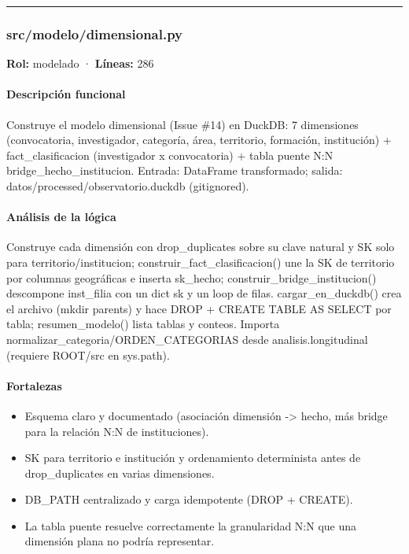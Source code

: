 \medskip
\hrule

\subsubsection{src/modelo/dimensional.py}
\textbf{Rol:} modelado · \textbf{Líneas:} 286

\paragraph{Descripción funcional}
Construye el modelo dimensional (Issue \#14) en DuckDB: 7 dimensiones (convocatoria, investigador, categoría, área, territorio, formación, institución) + fact\_clasificacion (investigador x convocatoria) + tabla puente N:N bridge\_hecho\_institucion. Entrada: DataFrame transformado; salida: datos/processed/observatorio.duckdb (gitignored).

\paragraph{Análisis de la lógica}
Construye cada dimensión con drop\_duplicates sobre su clave natural y SK solo para territorio/institucion; construir\_fact\_clasificacion() une la SK de territorio por columnas geográficas e inserta sk\_hecho; construir\_bridge\_institucion() descompone inst\_filia con un dict sk y un loop de filas. cargar\_en\_duckdb() crea el archivo (mkdir parents) y hace DROP + CREATE TABLE AS SELECT por tabla; resumen\_modelo() lista tablas y conteos. Importa normalizar\_categoria/ORDEN\_CATEGORIAS desde analisis.longitudinal (requiere ROOT/src en sys.path).

\paragraph{Fortalezas}
\begin{itemize}
  \item Esquema claro y documentado (asociación dimensión -> hecho, más bridge para la relación N:N de instituciones).
  \item SK para territorio e institución y ordenamiento determinista antes de drop\_duplicates en varias dimensiones.
  \item DB\_PATH centralizado y carga idempotente (DROP + CREATE).
  \item La tabla puente resuelve correctamente la granularidad N:N que una dimensión plana no podría representar.
\end{itemize}

